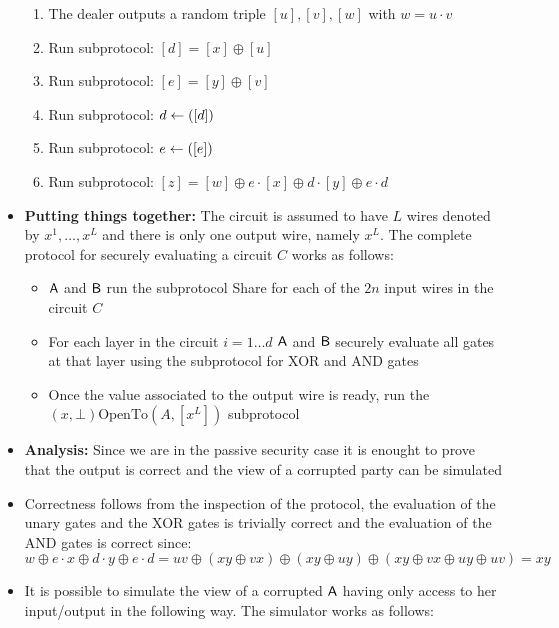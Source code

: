 \begin{itemize}
    \begin{enumerate}
        \item The dealer outputs a random triple $[u], [v], [w]$ with $w = u \cdot v$
        \item Run subprotocol: $[d] = [x] \oplus [u]$
        \item Run subprotocol: $[e] = [y] \oplus [v]$
        \item Run subprotocol: $d \leftarrow \text([d])$
        \item Run subprotocol: $e \leftarrow \text([e])$
        \item Run subprotocol: $[z] = [w] \oplus e \cdot [x] \oplus d \cdot [y] \oplus e \cdot d$
    \end{enumerate}
\item \textbf{Putting things together:} The circuit is assumed to have $L$ wires denoted by $x^1, \dots, x^L$ and there is only one output wire, namely $x^L$. The complete protocol for securely evaluating a circuit $C$ works as follows:
    \begin{itemize}
        \item $\mathsf{A}$ and $\mathsf{B}$ run the subprotocol Share for each of the $2n$ input wires in the circuit $C$
        \item For each layer in the circuit $i= 1 \dots d$ $\mathsf{A}$ and $\mathsf{B}$ securely evaluate all gates at that layer using the subprotocol for XOR and AND gates
        \item Once the value associated to the output wire is ready, run the $(x,\bot) \text{OpenTo}(A, [x^L])$ subprotocol
    \end{itemize}
\item \textbf{Analysis:} Since we are in the passive security case it is enought to prove that the output is correct and the view of a corrupted party can be simulated
\item Correctness follows from the inspection of the protocol, the evaluation of the unary gates and the XOR gates is trivially correct and the evaluation of the AND gates is correct since:
    \begin{equation*}
        w \oplus e \cdot x \oplus d \cdot y \oplus e \cdot d = uv \oplus (xy \oplus vx) \oplus (xy \oplus uy) \oplus (xy \oplus vx \oplus uy \oplus uv) = xy
    \end{equation*}
\item It is possible to simulate the view of a corrupted $\mathsf{A}$ having only access to her input/output in the following way. The simulator works as follows:
    \begin{enumerate}

\end{enumerate}
\end{itemize}
